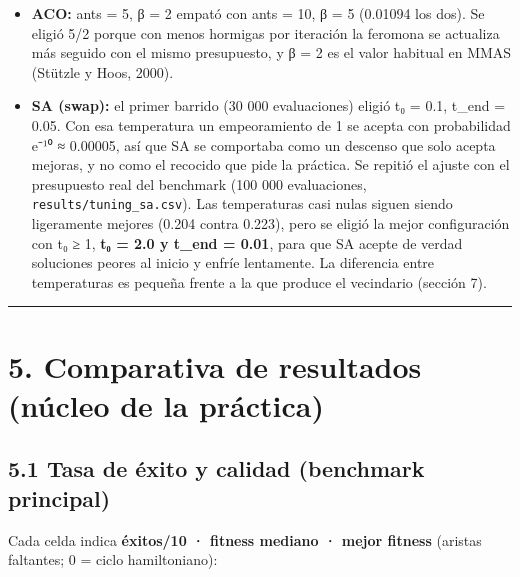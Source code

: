 \documentclass[
  spanish,
  11pt,
]{article}
\providecommand{\tightlist}{%
  \setlength{\itemsep}{0pt}\setlength{\parskip}{0pt}}
\begin{document}
\begin{itemize}
\tightlist
\item
  \textbf{ACO:} ants = 5, β = 2 empató con ants = 10, β = 5 (0.01094 los
  dos). Se eligió 5/2 porque con menos hormigas por iteración la
  feromona se actualiza más seguido con el mismo presupuesto, y β = 2 es
  el valor habitual en MMAS (Stützle y Hoos, 2000).
\item
  \textbf{SA (swap):} el primer barrido (30 000 evaluaciones) eligió t₀
  = 0.1, t\_end = 0.05. Con esa temperatura un empeoramiento de 1 se
  acepta con probabilidad e⁻¹⁰ ≈ 0.00005, así que SA se comportaba como
  un descenso que solo acepta mejoras, y no como el recocido que pide la
  práctica. Se repitió el ajuste con el presupuesto real del benchmark
  (100 000 evaluaciones, \texttt{results/tuning\_sa.csv}). Las
  temperaturas casi nulas siguen siendo ligeramente mejores (0.204
  contra 0.223), pero se eligió la mejor configuración con t₀ ≥ 1,
  \textbf{t₀ = 2.0 y t\_end = 0.01}, para que SA acepte de verdad
  soluciones peores al inicio y enfríe lentamente. La diferencia entre
  temperaturas es pequeña frente a la que produce el vecindario (sección
  7).
\end{itemize}

\begin{center}\rule{0.5\linewidth}{0.5pt}\end{center}

\section{5. Comparativa de resultados (núcleo de la
práctica)}\label{comparativa-de-resultados-nuxfacleo-de-la-pruxe1ctica}

\subsection{5.1 Tasa de éxito y calidad (benchmark
principal)}\label{tasa-de-uxe9xito-y-calidad-benchmark-principal}

Cada celda indica \textbf{éxitos/10 · fitness mediano · mejor fitness}
(aristas faltantes; 0 = ciclo hamiltoniano):
\end{document}
